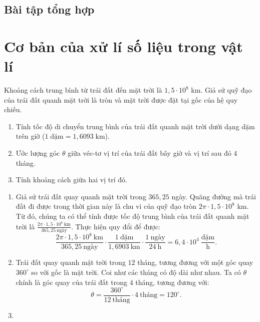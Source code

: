 \documentclass[a4paper, titlepage, openany]{book}
\newcounter{exercise}
\newcounter{solution}
\begin{document}
\section{Bài tập tổng hợp}


\chapter{Cơ bản của xử lí số liệu trong vật lí}
\exercise Khoảng cách trung bình từ trái đất đến mặt trời là $1{,}5 \cdot 10^8$ km. Giả sử quỹ đạo của trái đất quanh mặt trời là tròn và mặt trời được đặt tại gốc của hệ quy chiếu.
\begin{enumerate}
   \item Tính tốc độ di chuyển trung bình của trái đất quanh mặt trời dưới dạng dặm trên giờ ($1 \;\text{dặm}=1{,}6093\;\text{km}$).
   \item Ước lượng góc $\theta$ giữa véc-tơ vị trí của trái đất bây giờ và vị trí sau đó $4$ tháng.
   \item Tính khoảng cách giữa hai vị trí đó.
\end{enumerate}
\solution
\begin{enumerate}
   \item Giả sử trái đất quay quanh mặt trời trong $365{,}25$ ngày. Quãng đường mà trái đất đi được trong thời gian này là chu vi của quỹ đạo tròn $2 \pi \cdot 1{,}5 \cdot 10^8$ km. Từ đó, chúng ta có thể tính được tốc độ trung bình của trái đất quanh mặt trời là $\frac{2 \pi \cdot 1{,}5 \cdot 10^8\ \text{km}}{365{,}25\ \text{ngày}}$. Thực hiện quy đổi để được:
      \[
         \frac{2 \pi \cdot 1{,}5 \cdot 10^8\ \text{km}}{365{,}25\ \text{ngày}}
         \cdot \frac{1\ \text{dặm}}{1{,}6903\ \text{km}}
         \cdot \frac{1\ \text{ngày}}{24\ \text{h}}
         = \boxed{6{,}4\cdot 10^4\ \frac{\text{dặm}}{\text{h}}}.
      \]
   \item Trái đất quay quanh mặt trời trong $12$ tháng, tương đương với một góc quay $360^{\circ}$ so với gốc là mặt trời. Coi như các tháng có độ dài như nhau. Ta có $\theta$ chính là góc quay của trái đất trong $4$ tháng, tương đương với:
   \[
      \theta = \frac{360^{\circ}}{12\ \text{tháng}} \cdot 4\ \text{tháng}= \boxed{120^{\circ}}.
   \]
   \item
\end{enumerate}
\end{document}
